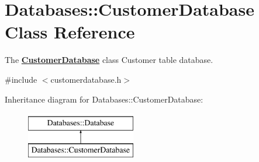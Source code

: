 \hypertarget{classDatabases_1_1CustomerDatabase}{}\section{Databases\+:\+:Customer\+Database Class Reference}
\label{classDatabases_1_1CustomerDatabase}


The {\bfseries \hyperlink{classDatabases_1_1CustomerDatabase}{Customer\+Database}} class Customer table database.  




{\ttfamily \#include $<$customerdatabase.\+h$>$}

Inheritance diagram for Databases\+:\+:Customer\+Database\+:\begin{figure}[H]
\begin{center}
\leavevmode
\includegraphics[height=2.000000cm]{d8/d7e/classDatabases_1_1CustomerDatabase}
\end{center}
\end{figure}

